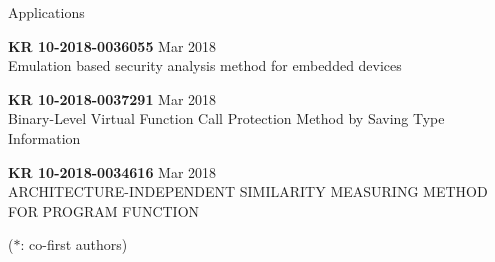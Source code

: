 \begin{timeenumerate}{Applications}{}
    \item \textbf{KR 10-2018-0036055} \hfill Mar 2018 \\
    {\small Emulation based security analysis method for embedded devices}

    \item \textbf{KR 10-2018-0037291} \hfill Mar 2018 \\
    {\small Binary-Level Virtual Function Call Protection Method by Saving Type Information}

    \item \textbf{KR 10-2018-0034616} \hfill Mar 2018 \\
    {\small ARCHITECTURE-INDEPENDENT SIMILARITY MEASURING METHOD FOR PROGRAM FUNCTION}
\end{timeenumerate}

($\ast$: co-first authors)

